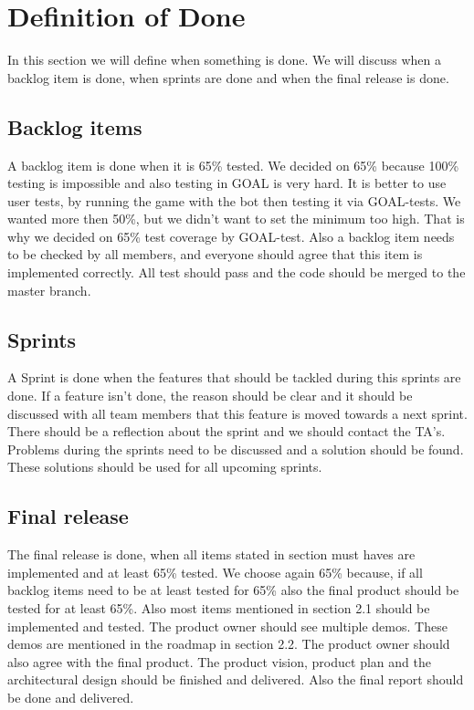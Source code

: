 \newpage
\section{Definition of Done}
In this section we will define when something is done. We will discuss when a backlog item is done, when sprints are done and when the final release is done.
\subsection{Backlog items}
A backlog item is done when it is 65\% tested. We decided on 65\% because 100\% testing is impossible and also testing in GOAL is very hard. It is better to use user tests, by running the game with the bot then testing it via GOAL-tests. We wanted more then 50\%, but we didn't want to set the minimum too high. That is why we decided on 65\% test coverage by GOAL-test.  Also a backlog item needs to be checked by all members, and everyone should agree that this item is implemented correctly. All test should pass and the code should be merged to the master branch.
\subsection{Sprints}
A Sprint is done when the features that should be tackled during this sprints are done. If a feature isn't done, the reason should be clear and it should be discussed with all team members that this feature is moved towards a next sprint. There should be a reflection about the sprint and we should contact the TA's. Problems during the sprints need to be discussed and a solution should be found. These solutions should be used for all upcoming sprints.
\subsection{Final release}
The final release is done, when all items stated in section must haves are implemented and at least 65\% tested. We choose again 65\% because, if all backlog items need to be at least tested for 65\% also the final product should be tested for at least 65\%. Also most items mentioned in section 2.1 should be implemented and tested. \newline
The product owner should see multiple demos. These demos are mentioned in the roadmap in section 2.2. The product owner should also agree with the final product. \newline
The product vision, product plan and the architectural design should be finished and delivered. Also the final report should be done and delivered. 